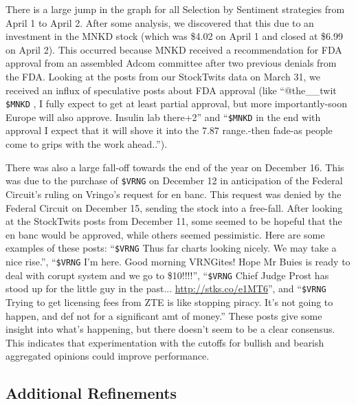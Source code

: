 There is a large jump in the graph for all Selection by Sentiment strategies from April 1 to April 2.
After some analysis, we discovered that this due to an investment in the MNKD stock (which was \$4.02 on April 1 and closed at \$6.99 on April 2).
This occurred because MNKD received a recommendation for FDA approval from an assembled Adcom committee after two previous denials from the FDA.
Looking at the posts from our StockTwits data on March 31, we received an influx of speculative posts about FDA approval (like ``@the\_\_twit \texttt{\$MNKD} , I fully expect to get at least partial approval, but more importantly-soon Europe will also approve. Insulin lab there+2'' and ``\texttt{\$MNKD} in the end with approval I expect that it will shove it into the 7.87 range.-then fade-as people come to grips with the work ahead..'').

There was also a large fall-off towards the end of the year on December 16.
This was due to the purchase of \texttt{\$VRNG} on December 12 in anticipation of the Federal Circuit’s ruling on Vringo’s request for en banc.
This request was denied by the Federal Circuit on December 15, sending the stock into a free-fall.
After looking at the StockTwits posts from December 11, some seemed to be hopeful that the en banc would be approved, while others seemed pessimistic.
Here are some examples of these posts: ``\texttt{\$VRNG} Thus far charts looking nicely. We may take a nice rise.'', ``\texttt{\$VRNG} I’m here. Good morning VRNGites! Hope Mr Buies is ready to deal with corupt system and we go to \$10!!!!'', ``\texttt{\$VRNG} Chief Judge Prost has stood up for the little guy in the past...  \url{http://stks.co/e1MT6}'', and ``\texttt{\$VRNG} Trying to get licensing fees from ZTE is like stopping piracy. It’s not going to happen, and def not for a significant amt of money.''
These posts give some insight into what’s happening, but there doesn’t seem to be a clear consensus.
This indicates that experimentation with the cutoffs for bullish and bearish aggregated opinions could improve performance.

\subsection{Additional Refinements}

